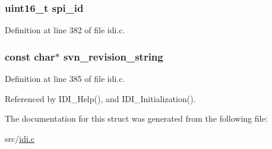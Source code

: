 \hypertarget{structidi__dataset_a17f90bb8bd6a75c9d05d2df69b5e6ba3}{
\subsubsection[{spi\+\_\+id}]{\setlength{\rightskip}{0pt plus 5cm}uint16\+\_\+t spi\+\_\+id}}\label{structidi__dataset_a17f90bb8bd6a75c9d05d2df69b5e6ba3}


Definition at line 382 of file idi.\+c.

\hypertarget{structidi__dataset_a02b7232561c6ed9540ce106d328eedf8}{
\subsubsection[{svn\+\_\+revision\+\_\+string}]{\setlength{\rightskip}{0pt plus 5cm}const char$\ast$ svn\+\_\+revision\+\_\+string}}\label{structidi__dataset_a02b7232561c6ed9540ce106d328eedf8}


Definition at line 385 of file idi.\+c.



Referenced by I\+D\+I\+\_\+\+Help(), and I\+D\+I\+\_\+\+Initialization().



The documentation for this struct was generated from the following file\+:\begin{DoxyCompactItemize}
\item 
src/\hyperlink{idi_8c}{idi.\+c}\end{DoxyCompactItemize}
